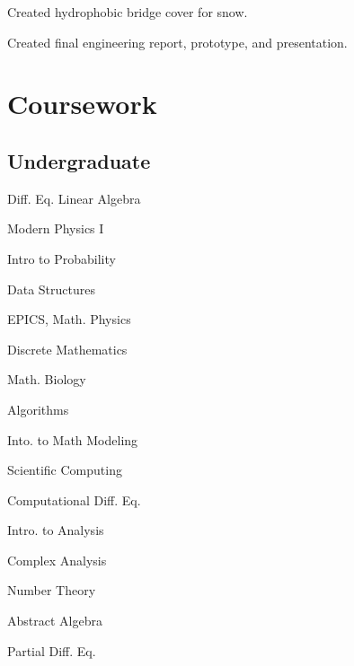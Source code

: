 \documentclass[]{deedy-resume-openfont}
\begin{document}
\begin{minipage}[t]{0.55\textwidth}
\vspace{\topsep}
\begin{tightemize}
\item Created hydrophobic bridge cover for snow.
\item Created final engineering report, prototype, and presentation.
\end{tightemize}
\sectionsep


\section{Coursework}
\subsection{Undergraduate}
\begin{minipage}[t]{0.45\textwidth} 
\vspace{\topsep} %
\begin{tightemize}
\item Diff. Eq. Linear Algebra
\item Modern Physics I
\item Intro to Probability
\item Data Structures
\item EPICS, Math. Physics
\item Discrete Mathematics
\item Math. Biology
\item Algorithms
\end{tightemize}
\end{minipage}
\begin{minipage}[t]{0.45\textwidth}
\vspace{\topsep} %
\begin{tightemize}
\item Into. to Math Modeling
\item Scientific Computing
\item Computational Diff. Eq.
\item Intro. to Analysis
\item Complex Analysis
\item Number Theory
\item Abstract Algebra
\item Partial Diff. Eq.
\end{tightemize}
\end{minipage}
\sectionsep



\end{minipage}
\end{document}

